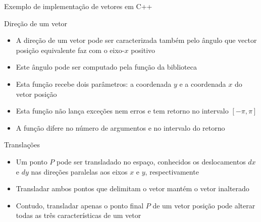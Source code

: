 \begin{frame}[fragile]{Exemplo de implementação de vetores em C++}
\end{frame}

\begin{frame}[fragile]{Direção de um vetor}

    \begin{itemize}
        \item A direção de um vetor pode ser caracterizada também pelo ângulo que vector posição
            equivalente faz com o eixo-$x$ positivo

        \item Este ângulo pode ser computado pela função  da biblioteca 

        \item Esta função recebe dois parâmetros: a coordenada $y$ e a coordenada $x$ do
            vetor posição

        \item Esta função não lança exceções nem erros e tem retorno no intervalo $[-\pi, \pi]$

        \item A função  difere no número de argumentos e no intervalo do retorno
    \end{itemize}

\end{frame}

\begin{frame}[fragile]{Translações}

    \begin{itemize}
        \item Um ponto $P$ pode ser transladado no espaço, conhecidos os deslocamentos $dx$ e 
        $dy$ nas direções paralelas aos eixos $x$ e $y$, respectivamente

        \item Transladar ambos pontos que delimitam o vetor mantém o vetor inalterado

        \item Contudo, transladar apenas o ponto final $P$ de um vetor posição pode alterar todas
            as três características de um vetor

    \end{itemize}

\end{frame}

